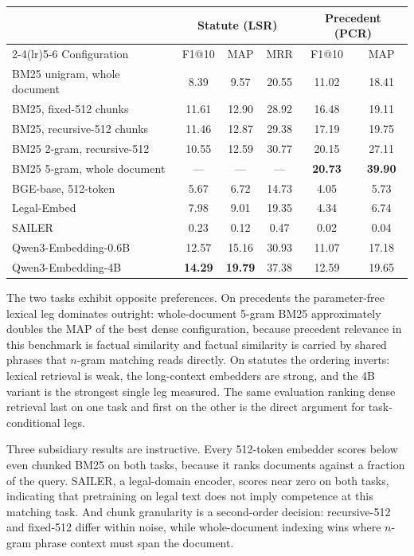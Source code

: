 \documentclass{mnnit}
\makeatletter
\newcommand{\tabcaption}[1]{\def\@captype{table}\caption{#1}}
\makeatother
\begin{document}
\begin{center}
\small
\tabcaption{First-stage retrieval on the development split
($n=627$). Best per column in bold; the 5-gram precedent row was
measured on the whole-document index required by that
tokenisation.}
\label{tab:firststage}
\vspace{2mm}
\begin{tabular}{lccccc}
\toprule
 & \multicolumn{3}{c}{Statute (LSR)} & \multicolumn{2}{c}{Precedent (PCR)} \\
\cmidrule(lr){2-4}\cmidrule(lr){5-6}
Configuration & F1@10 & MAP & MRR & F1@10 & MAP \\
\midrule
BM25 unigram, whole document & 8.39 & 9.57 & 20.55 & 11.02 & 18.41 \\
BM25, fixed-512 chunks & 11.61 & 12.90 & 28.92 & 16.48 & 19.11 \\
BM25, recursive-512 chunks & 11.46 & 12.87 & 29.38 & 17.19 & 19.75 \\
BM25 2-gram, recursive-512 & 10.55 & 12.59 & 30.77 & 20.15 & 27.11 \\
BM25 5-gram, whole document & --- & --- & --- & \textbf{20.73} & \textbf{39.90} \\
BGE-base, 512-token & 5.67 & 6.72 & 14.73 & 4.05 & 5.73 \\
Legal-Embed & 7.98 & 9.01 & 19.35 & 4.34 & 6.74 \\
SAILER & 0.23 & 0.12 & 0.47 & 0.02 & 0.04 \\
Qwen3-Embedding-0.6B & 12.57 & 15.16 & 30.93 & 11.07 & 17.18 \\
Qwen3-Embedding-4B & \textbf{14.29} & \textbf{19.79} & 37.38 & 12.59 & 19.65 \\
\bottomrule
\end{tabular}
\end{center}

The two tasks exhibit opposite preferences. On precedents the
parameter-free lexical leg dominates outright: whole-document
5-gram BM25 approximately doubles the MAP of the best dense
configuration, because precedent relevance in this benchmark is
factual similarity and factual similarity is carried by shared
phrases that $n$-gram matching reads directly. On statutes the
ordering inverts: lexical retrieval is weak, the long-context
embedders are strong, and the 4B variant is the strongest single
leg measured. The same evaluation ranking dense retrieval last on
one task and first on the other is the direct argument for
task-conditional legs.

Three subsidiary results are instructive. Every 512-token
embedder scores below even chunked BM25 on both tasks, because it
ranks documents against a fraction of the query. SAILER, a
legal-domain encoder, scores near zero on both tasks, indicating
that pretraining on legal text does not imply competence at this
matching task. And chunk granularity is a second-order decision:
recursive-512 and fixed-512 differ within noise, while
whole-document indexing wins where $n$-gram phrase context must
span the document.
\end{document}
